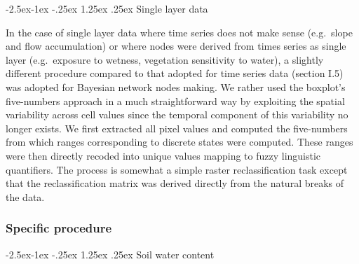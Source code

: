 \documentclass[12pt,oneside]{article}
\makeatletter
\renewcommand\paragraph{\@startsection{paragraph}{4}{\z@}%
            {-2.5ex\@plus -1ex \@minus -.25ex}%
            {1.25ex \@plus .25ex}%
            {\normalfont\normalsize\bfseries}}
\makeatother
\begin{document}
\hypertarget{I.5.1.2}{%
\paragraph{Single layer data}\label{I.5.1.2}}

In the case of single layer data where time series does not make sense
(e.g.~slope and flow accumulation) or where nodes were derived from
times series as single layer (e.g.~exposure to wetness, vegetation
sensitivity to water), a slightly different procedure compared to that
adopted for time series data (section I.5) was adopted for Bayesian
network nodes making. We rather used the boxplot's five-numbers approach
in a much straightforward way by exploiting the spatial variability
across cell values since the temporal component of this variability no
longer exists. We first extracted all pixel values and computed the
five-numbers from which ranges corresponding to discrete states were
computed. These ranges were then directly recoded into unique values
mapping to fuzzy linguistic quantifiers. The process is somewhat a
simple raster reclassification task except that the reclassification
matrix was derived directly from the natural breaks of the data.

\hypertarget{I.5.2}{%
\subsubsection{Specific procedure}\label{I.5.2}}

\hypertarget{I.5.2.1}{%
\paragraph{Soil water content}\label{I.5.2.1}}
\end{document}
